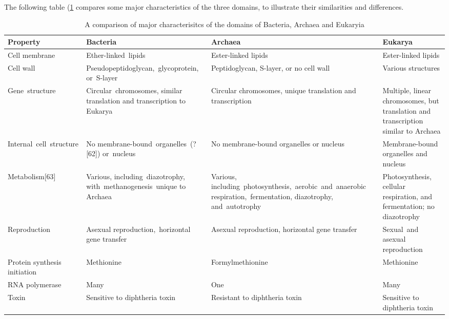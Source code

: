 The following table (\ref{tab:domaincomparison} compares some major characteristics of the three domains, to illustrate their similarities and differences.
\onecolumn
\begin{table}

\caption{\label{tab:domaincomparison}A comparison of major characterisitcs of the domains of Bacteria, Archaea and Eukaryia}
\centering
\begin{tabular}[t]{>{\raggedright\arraybackslash}p{10em}>{\raggedright\arraybackslash}p{20em}>{\raggedright\arraybackslash}p{15em}>{\raggedright\arraybackslash}p{20em}}
\toprule
Property & Bacteria & Archaea & Eukarya\\
\midrule
\rowcolor{gray!6}  Cell membrane & Ether-linked lipids & Ester-linked lipids & Ester-linked lipids\\
Cell wall & Pseudopeptidoglycan, glycoprotein, or S-layer & Peptidoglycan, S-layer, or no cell wall & Various structures\\
\rowcolor{gray!6}  Gene structure & Circular chromosomes, similar translation and transcription to Eukarya & Circular chromosomes, unique translation and transcription & Multiple, linear chromosomes, but translation and transcription similar to Archaea\\
Internal cell structure & No membrane-bound organelles (?[62]) or nucleus & No membrane-bound organelles or nucleus & Membrane-bound organelles and nucleus\\
\rowcolor{gray!6}  Metabolism[63] & Various, including diazotrophy, with methanogenesis unique to Archaea & Various, including photosynthesis, aerobic and anaerobic respiration, fermentation, diazotrophy, and autotrophy & Photosynthesis, cellular respiration, and fermentation; no diazotrophy\\
\addlinespace
Reproduction & Asexual reproduction, horizontal gene transfer & Asexual reproduction, horizontal gene transfer & Sexual and asexual reproduction\\
\rowcolor{gray!6}  Protein synthesis initiation & Methionine & Formylmethionine & Methionine\\
RNA polymerase & Many & One & Many\\
\rowcolor{gray!6}  Toxin & Sensitive to diphtheria toxin & Resistant to diphtheria toxin & Sensitive to diphtheria toxin\\
\bottomrule
\end{tabular}
\end{table}

\twocolumn


